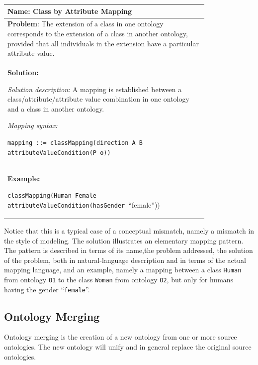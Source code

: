 \begin{center}
\label{tab:MappingPattern}
\tablehead{}
\begin{supertabular}{|m{0.8\linewidth}|}
\hline
\textbf{Name}: Class by Attribute Mapping \\\hline
\textbf{Problem}: The extension of a class in one ontology
corresponds to the extension of a class in another ontology, provided
that all individuals in the extension have a particular attribute
value. \\\hline
\textbf{Solution:} 

\textit{Solution description}: A mapping is established
between a class/attribute/attribute value combination in one ontology
and a class in another ontology. 

\textit{Mapping syntax:} 

\texttt{mapping ::= classMapping(direction A
B attributeValueCondition(P o))} \\\hline
\textbf{Example:} 

\texttt{classMapping(Human Female
attributeValueCondition(hasGender
}{\textquotedblleft}female{\textquotedblright})) \\\hline
\end{supertabular}
\end{center}

Notice that this is a typical case of a
conceptual mismatch, namely a mismatch in the style of modeling. The
solution illustrates an elementary mapping pattern. The pattern is
described in terms of its name,the problem addressed, the solution of
the problem, both in natural-language description and in terms of the
actual mapping language, and an example, namely a mapping between a
class \texttt{Human} from ontology
\texttt{O1} to the class \texttt{Woman} from
ontology \texttt{O2}, but only for humans having the
gender
{\textquotedblleft}\texttt{female}{\textquotedblright}.

\subsection{Ontology Merging}
\label{subsec:mediationapproaches_ontologymerging}
Ontology merging is the creation of a new ontology from one or more
source ontologies. The new ontology will unify and in general replace
the original source ontologies. 

